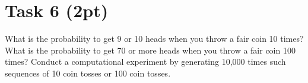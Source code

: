 \documentclass{article}
\begin{document}
\section*{Task 6 (2pt)}
What is the probability to get 9 or 10 heads when you throw a fair coin 10 times? What is the probability to get 70 or more heads when you throw a fair coin 100 times? Conduct a computational experiment by generating 10,000 times such sequences of 10 coin tosses or 100 coin tosses.
\end{document}
